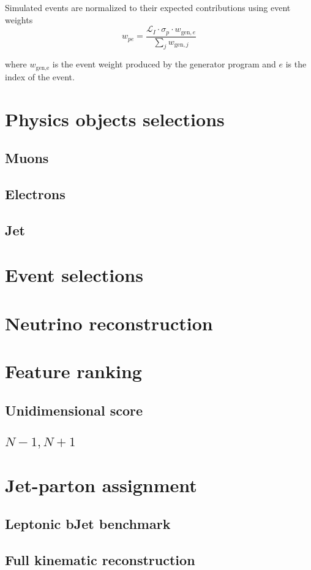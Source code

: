 Simulated events are normalized to
their expected contributions using event weights 
\begin{equation}
    w_{pe}=\frac{\mathcal{L}_I \cdot \sigma_p \cdot w_{\text{gen},e} }{\sum_j w_{\text{gen},j}}
\end{equation}

where $w_{\text{gen,e}}$ is the event weight produced by the generator program and $e$ is the index of the event. 

\section{Physics objects selections}
\subsection{Muons}
\subsection{Electrons}
\subsection{Jet}
\section{Event selections}
\section{Neutrino reconstruction}
\section{Feature ranking}
\subsection{Unidimensional score}
\subsection{{$N-1,N+1$}}
\section{Jet-parton assignment}
\subsection{Leptonic bJet benchmark}
\subsection{Full kinematic reconstruction}

